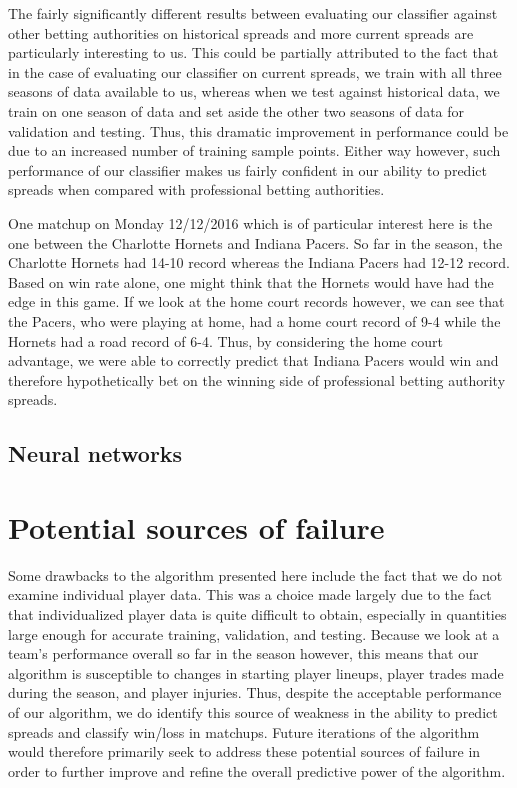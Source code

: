 \documentclass{article}
\begin{document}
The fairly significantly different results between evaluating our classifier against other betting authorities on historical spreads and more current spreads are particularly interesting to us. This could be partially attributed to the fact that in the case of evaluating our classifier on current spreads, we train with all three seasons of data available to us, whereas when we test against historical data, we train on one season of data and set aside the other two seasons of data for validation and testing. Thus, this dramatic improvement in performance could be due to an increased number of training sample points. Either way however, such performance of our classifier makes us fairly confident in our ability to predict spreads when compared with professional betting authorities.

One matchup on Monday 12/12/2016 which is of particular interest here is the one between the Charlotte Hornets and Indiana Pacers. So far in the season, the Charlotte Hornets had 14-10 record whereas the Indiana Pacers had 12-12 record. Based on win rate alone, one might think that the Hornets would have had the edge in this game. If we look at the home court records however, we can see that the Pacers, who were playing at home, had a home court record of 9-4 while the Hornets had a road record of 6-4. Thus, by considering the home court advantage, we were able to correctly predict that Indiana Pacers would win and therefore hypothetically bet on the winning side of professional betting authority spreads.

\subsection{Neural networks}


\section{Potential sources of failure}
Some drawbacks to the algorithm presented here include the fact that we do not examine individual player data. This was a choice made largely due to the fact that individualized player data is quite difficult to obtain, especially in quantities large enough for accurate training, validation, and testing. Because we look at a team's performance overall so far in the season however, this means that our algorithm is susceptible to changes in starting player lineups, player trades made during the season, and player injuries. Thus, despite the acceptable performance of our algorithm, we do identify this source of weakness in the ability to predict spreads and classify win/loss in matchups. Future iterations of the algorithm would therefore primarily seek to address these potential sources of failure in order to further improve and refine the overall predictive power of the algorithm.
\end{document}
